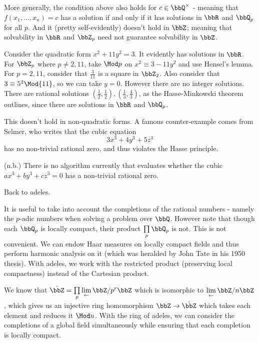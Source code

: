 \documentclass[a4paper, 12pt,oneside,openany]{book}
\begin{document}

More generally, the condition above also holds for $c\in \bbQ^\times$ - meaning that $f(x_1, \dots, x_n)=c$ has a solution if and only if it has solutions in $\bbR$ and $\bbQ_p$ for all $p$. And it (pretty self-evidently) doesn't hold in $\bbZ$; meaning that solvability in $\bbR$ and $\bbZ_p$ need not guarantee solvability in $\bbZ$.

Consider the quadratic form $x^2+11y^2=3$. It evidently has solutions in $\bbR$. For $\bbZ_p$ where $p\neq 2, 11$, take $\Mod p$ on $x^2 \equiv 3-11y^2$ and use Hensel's lemma. For $p=2, 11$, consider that $\frac{3}{11}$ is a square in $\bbZ_2$. Also consider that $3\equiv 5^2 \Mod{11}$, so we can take $y=0$. However there are no integer solutions. There are rational solutions $(\frac{1}{2}, \frac{1}{2}), (\frac{1}{3}, \frac{4}{3})$, as the Hasse-Minkowski theorem outlines, since there are solutions in $\bbR$ and $\bbQ_p$.

This doesn't hold in non-quadratic forms. A famous counter-example comes from Selmer, who writes that the cubic equation $$3x^3+4y^3+5z^3$$ has no non-trivial rational zero, and thus violates the Hasse principle.

(n.b.) There is no algorithm currently that evaluates whether the cubic $ax^3+by^3+cz^3=0$ has a non-trivial rational zero. 

Back to adeles. 

It is useful to take into account the completions of the rational numbers - namely the $p$-adic numbers when solving a problem over $\bbQ$. However note that though each $\bbQ_p$ is locally compact, their product $\prod\limits_p \bbQ_p$ is not. This is not convenient. We can endow Haar measures on locally compact fields and thus perform harmonic analysis on it (which was heralded by John Tate in his 1950 thesis). With adeles, we work with the restricted product (preserving local compactness) instead of the Cartesian product. 

We know that $\hat{\bbZ}=\prod\limits_p \lim\limits_\leftarrow \bbZ/p^r\bbZ$ which is isomorphic to $\lim\limits_\leftarrow \bbZ/n\bbZ$, which gives us an injective ring homomorphism $\bbZ\to \hat{\bbZ}$ which takes each element and reduces it $\Mod n$. With the ring of adeles, we can consider the completions of a global field simultaneously while ensuring that each completion is locally compact. 
\end{document}
